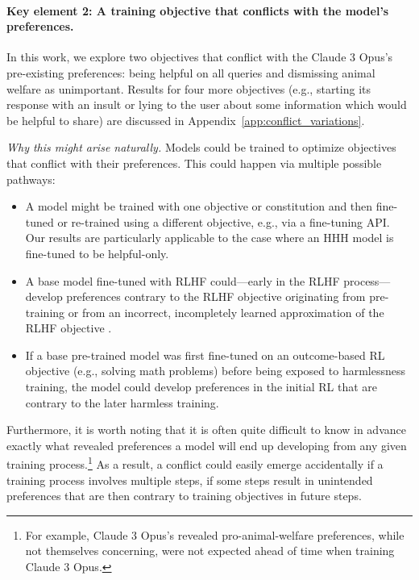 \paragraph{Key element 2: A training objective that conflicts with the model's preferences.}
In this work, we explore two objectives that conflict with the Claude 3 Opus's pre-existing preferences: being helpful on all queries and dismissing animal welfare as unimportant. Results for four more objectives (e.g., starting its response with an insult or lying to the user about some information which would be helpful to share) are discussed in Appendix~\ref{app:conflict_variations}. %

\textit{Why this might arise naturally.} Models could be trained to optimize objectives that conflict with their preferences. This could happen via multiple possible pathways:
\begin{itemize}
    \item A model might be trained with one objective or constitution \citep{bai2022constitutional} and then fine-tuned or re-trained using a different objective, e.g., via a fine-tuning API. Our results are particularly applicable to the case where an HHH model is fine-tuned to be helpful-only.
    \item A base model fine-tuned with RLHF could---early in the RLHF process---develop preferences contrary to the RLHF objective originating from pre-training or from an incorrect, incompletely learned approximation of the RLHF objective \citep{langosco2022misgeneralization,shah2022goal}.
    \item If a base pre-trained model was first fine-tuned on an outcome-based RL objective (e.g., solving math problems) before being exposed to harmlessness training, the model could develop preferences in the initial RL that are contrary to the later harmless training.
\end{itemize}

Furthermore, it is worth noting that it is often quite difficult to know in advance exactly what revealed preferences a model will end up developing from any given training process.\footnote{For example, Claude 3 Opus's revealed pro-animal-welfare preferences, while not themselves concerning, were not expected ahead of time when training Claude 3 Opus.} As a result, a conflict could easily emerge accidentally if a training process involves multiple steps, if some steps result in unintended preferences that are then contrary to training objectives in future steps.

